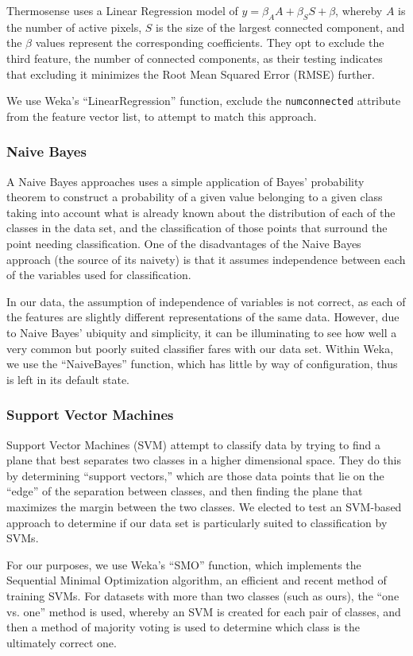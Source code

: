 \documentclass[../thesis/thesis.tex]{subfiles}
\begin{document}
Thermosense uses a Linear Regression model of $y = \beta_A A + \beta_S S + \beta $, whereby $A$ is the number of active pixels, $S$ is the size of the largest connected component, and the $\beta$ values represent the corresponding coefficients. They opt to exclude the third feature, the number of connected components, as their testing indicates that excluding it minimizes the Root Mean Squared Error (RMSE) further. 

We use Weka's ``LinearRegression'' function, exclude the \texttt{numconnected} attribute from the feature vector list, to attempt to match this approach.

\subsubsection{Naive Bayes}
A Naive Bayes approaches uses a simple application of Bayes' probability theorem to construct a probability of a given value belonging to a given class taking into account what is already known about the distribution of each of the classes in the data set, and the classification of those points that surround the point needing classification. One of the disadvantages of the Naive Bayes approach (the source of its naivety) is that it assumes independence between each of the variables used for classification.

In our data, the assumption of independence of variables is not correct, as each of the features are slightly different representations of the same data. However, due to Naive Bayes' ubiquity and simplicity, it can be illuminating to see how well a very common but poorly suited classifier fares with our data set. Within Weka, we use the ``NaiveBayes'' function, which has little by way of configuration, thus is left in its default state.

\subsubsection{Support Vector Machines}
Support Vector Machines (SVM) attempt to classify data by trying to find a plane that best separates two classes in a higher dimensional space. They do this by determining ``support vectors,'' which are those data points that lie on the ``edge'' of the separation between classes, and then finding the plane that maximizes the margin between the two classes. We elected to test an SVM-based approach to determine if our data set is particularly suited to classification by SVMs.

For our purposes, we use Weka's ``SMO'' function, which implements the Sequential Minimal Optimization algorithm, an efficient and recent method of training SVMs. For datasets with more than two classes (such as ours), the ``one vs. one'' method is used, whereby an SVM is created for each pair of classes, and then a method of majority voting is used to determine which class is the ultimately correct one. %
\end{document}
